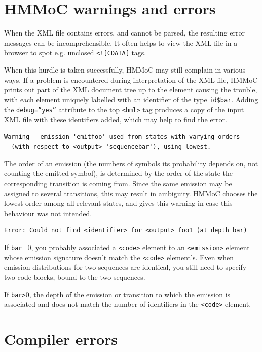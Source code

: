 \documentclass{article}
\begin{document}
\section{HMMoC warnings and errors}

When the XML file contains errors, and cannot be parsed, the resulting error messages can be
incomprehensible.  It often helps to view the XML file in a browser to spot e.g. unclosed
{\tt <![CDATA[} tags.

When this hurdle is taken successfully, HMMoC may still complain in various ways.  If a problem
is encountered during interpretation of the XML file, HMMoC prints out part of the XML document tree up
to the element causing the trouble, with each element uniquely labelled with an identifier of the type 
{\tt id\$bar}.  Adding the {\tt debug=''yes''} attribute to the top {\tt <hml>} tag produces a copy of 
the input XML file with these identifiers added, which may help to find the error.  

\begin{verbatim}
Warning - emission 'emitfoo' used from states with varying orders 
  (with respect to <output> 'sequencebar'), using lowest.
\end{verbatim}

The order of an emission (the numbers of symbols its probability depends on, not counting the emitted symbol),
is determined by the order of the state the corresponding transition is coming from.  Since the same emission
may be assigned to several transitions, this may result in ambiguity.  HMMoC chooses the lowest order among
all relevant states, and gives this warning in case this behaviour was not intended.

\begin{verbatim}
Error: Could not find <identifier> for <output> foo1 (at depth bar)
\end{verbatim}

If {\tt bar}=0, you probably associated a {\tt <code>} element to an {\tt <emission>}
element whose emission signature doesn't match the {\tt <code>} element's.  
Even when emission distributions for two sequences are identical, you still need to
specify two code blocks, bound to the two sequences. 

If {\tt bar>}0, the depth of the emission or transition to which the emission is associated
and does not match the number of identifiers in the {\tt <code>} element.

\section{Compiler errors}
\end{document}
